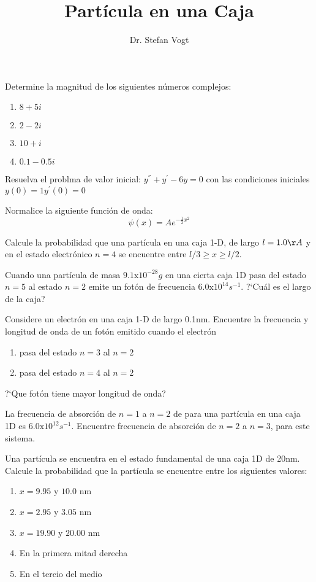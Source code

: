 \documentclass{../guias}
\author{Dr. Stefan Vogt}
\title{Partícula en una Caja}
\begin{document}
\guia

\problem{} 
Determine la magnitud de los siguientes números complejos:
\begin{enumerate}
\item $8+5i$
\item $2-2i$
\item $10+i$
\item $0.1-0.5i$
\end{enumerate}

\problem{}
Resuelva el problma de valor inicial: $y^{''} + y^{'} -6y = 0$ con las 
condiciones iniciales $y(0)=1$$y^{'}(0)=0$

\problem{}
Normalice la siguiente función de onda:
\begin{equation*}
    \psi(x) = Ae^{- \frac{1}{2}x^2}
\end{equation*}

\problem{}
Calcule la probabilidad que una partícula en una caja 1-D, 
de largo $l = 1.0 \AA$ y en el estado electrónico $n = 4$ se 
encuentre entre $l/3 \geq x \geq l/2$.

\problem{}
Cuando una partícula de masa $9.1\text{x}10^{-28}g$ en una cierta caja 1D pasa
del estado $n=5$ al estado $n=2$ emite un fotón de frecuencia $6.0\text{x}10^{14}s^{-1}$.
?`Cuál es el largo de la caja?

\problem{} Considere un electrón en una caja 1-D de largo 0.1nm.
Encuentre la frecuencia y longitud de onda de un fotón emitido
cuando el electrón
\begin{enumerate}
   \item pasa del estado $n=3$ al $n=2$
   \item pasa del estado $n=4$ al $n=2$
\end{enumerate}
?`Que fotón tiene mayor longitud de onda?

\problem{}
La frecuencia de absorción de $n=1$ a $n=2$ de para una partícula en una caja 1D es $6.0\text{x}10^{12}s^{-1}$.
Encuentre frecuencia de absorción de $n=2$ a $n=3$, para este sistema.

\problem{}
Una partícula se encuentra en el estado fundamental de una 
caja 1D de 20nm. Calcule la probabilidad que la partícula 
se encuentre entre los siguientes valores:
\begin{enumerate}
    \item $x = 9.95$ y $10.0$ nm
    \item $x = 2.95$ y $3.05$ nm
    \item $x = 19.90$ y $20.00$ nm
    \item En la primera mitad derecha
    \item En el tercio del medio
\end{enumerate}
\end{document}
